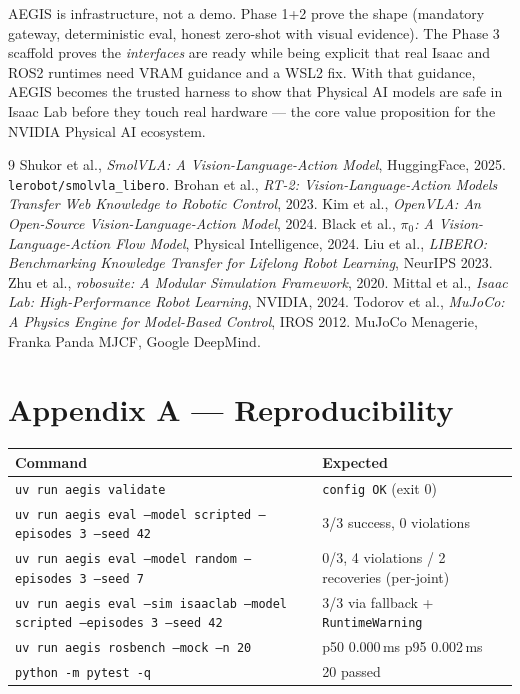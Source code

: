 \documentclass[11pt,a4paper,twocolumn]{article}
\begin{document}
AEGIS is infrastructure, not a demo. Phase 1+2 prove the shape (mandatory gateway, deterministic eval, honest zero-shot with visual evidence). The Phase 3 scaffold proves the \textit{interfaces} are ready while being explicit that real Isaac and ROS2 runtimes need VRAM guidance and a WSL2 fix. With that guidance, AEGIS becomes the trusted harness to show that Physical AI models are safe in Isaac Lab before they touch real hardware --- the core value proposition for the NVIDIA Physical AI ecosystem.

\begin{thebibliography}{9}
 Shukor et al., \textit{SmolVLA: A Vision-Language-Action Model}, HuggingFace, 2025. \texttt{lerobot/smolvla\_libero}.
 Brohan et al., \textit{RT-2: Vision-Language-Action Models Transfer Web Knowledge to Robotic Control}, 2023.
 Kim et al., \textit{OpenVLA: An Open-Source Vision-Language-Action Model}, 2024.
 Black et al., \textit{$\pi_0$: A Vision-Language-Action Flow Model}, Physical Intelligence, 2024.
 Liu et al., \textit{LIBERO: Benchmarking Knowledge Transfer for Lifelong Robot Learning}, NeurIPS 2023.
 Zhu et al., \textit{robosuite: A Modular Simulation Framework}, 2020.
 Mittal et al., \textit{Isaac Lab: High-Performance Robot Learning}, NVIDIA, 2024.
 Todorov et al., \textit{MuJoCo: A Physics Engine for Model-Based Control}, IROS 2012.
 MuJoCo Menagerie, Franka Panda MJCF, Google DeepMind.
\end{thebibliography}

\onecolumn
\appendix
\section*{Appendix A --- Reproducibility}

\begin{center}
\small
\begin{tabular}{ll}
\toprule
Command & Expected \\
\midrule
\texttt{uv run aegis validate} & \texttt{config OK} (exit 0) \\
\texttt{uv run aegis eval --model scripted --episodes 3 --seed 42} & 3/3 success, 0 violations \\
\texttt{uv run aegis eval --model random --episodes 3 --seed 7} & 0/3, 4 violations / 2 recoveries (per-joint) \\
\texttt{uv run aegis eval --sim isaaclab --model scripted --episodes 3 --seed 42} & 3/3 via fallback + \texttt{RuntimeWarning} \\
\texttt{uv run aegis rosbench --mock --n 20} & p50 0.000\,ms p95 0.002\,ms \\
\texttt{python -m pytest -q} & 20 passed \\
\bottomrule
\end{tabular}
\end{center}
\end{document}

